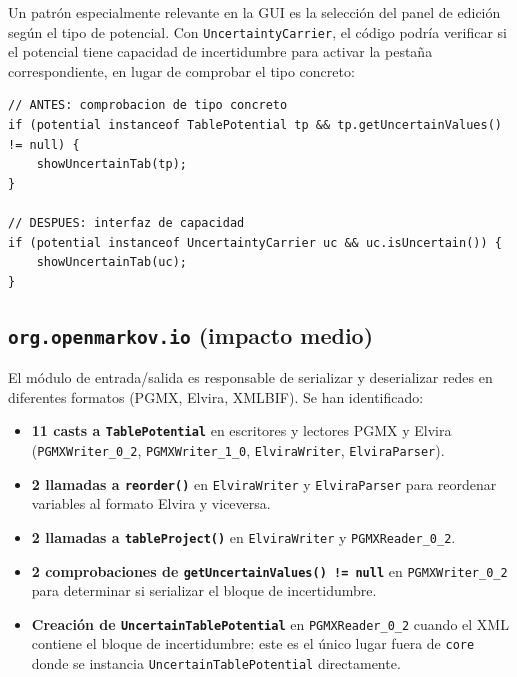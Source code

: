 \documentclass[11pt,a4paper]{article}
\newcommand{\code}[1]{\texttt{#1}}
\begin{document}
Un patrón especialmente relevante en la GUI es la selección del panel de
edición según el tipo de potencial.  Con \code{UncertaintyCarrier}, el
código podría verificar si el potencial tiene capacidad de incertidumbre
para activar la pestaña correspondiente, en lugar de comprobar el tipo concreto:

\begin{lstlisting}[caption={Simplificación del selector de panel en la GUI}]
// ANTES: comprobacion de tipo concreto
if (potential instanceof TablePotential tp && tp.getUncertainValues() != null) {
    showUncertainTab(tp);
}

// DESPUES: interfaz de capacidad
if (potential instanceof UncertaintyCarrier uc && uc.isUncertain()) {
    showUncertainTab(uc);
}
\end{lstlisting}

\subsection{\code{org.openmarkov.io} (impacto medio)}
\label{sec:op3-io}

El módulo de entrada/salida es responsable de serializar y deserializar redes
en diferentes formatos (PGMX, Elvira, XMLBIF).  Se han identificado:

\begin{itemize}
  \item \textbf{11 casts a \code{TablePotential}} en escritores y lectores PGMX
        y Elvira (\code{PGMXWriter\_0\_2}, \code{PGMXWriter\_1\_0},
        \code{ElviraWriter}, \code{ElviraParser}).

  \item \textbf{2 llamadas a \code{reorder()}} en \code{ElviraWriter} y
        \code{ElviraParser} para reordenar variables al formato Elvira y
        viceversa.

  \item \textbf{2 llamadas a \code{tableProject()}} en \code{ElviraWriter} y
        \code{PGMXReader\_0\_2}.

  \item \textbf{2 comprobaciones de \code{getUncertainValues() != null}} en
        \code{PGMXWriter\_0\_2} para determinar si serializar el bloque de
        incertidumbre.

  \item \textbf{Creación de \code{UncertainTablePotential}} en
        \code{PGMXReader\_0\_2} cuando el XML contiene el bloque de incertidumbre:
        este es el único lugar fuera de \code{core} donde se instancia
        \code{UncertainTablePotential} directamente.
\end{itemize}
\end{document}

